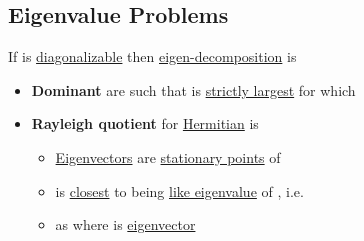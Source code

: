 \subsection*{Eigenvalue Problems}

If  is \underline{diagonalizable} then \underline{eigen-decomposition} is 

\begin{itemize}

      \item
            \textbf{Dominant}  are such that
             is \underline{strictly largest} for which
      \item
            \textbf{Rayleigh quotient} for \underline{Hermitian}  is

            \begin{itemize}

                  \item
                        \underline{Eigenvectors} are \underline{stationary points} of 
                  \item
                         is \underline{closest} to being \underline{like eigenvalue}
                        of , i.e. 
                  \item
                        as  where \iMbox{\nu} is \underline{eigenvector}
            \end{itemize}
\end{itemize}

\hSep %

